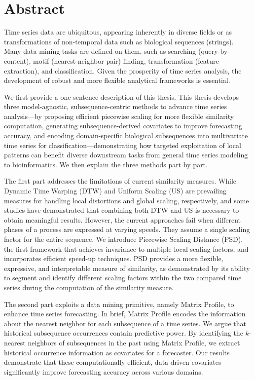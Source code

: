 \chapter*{Abstract}

Time series data are ubiquitous, appearing inherently in diverse fields or as transformations of non-temporal data such as biological sequences (strings).
%
Many data mining tasks are defined on them, such as searching (query-by-content), motif (nearest-neighbor pair) finding, transformation (feature extraction), and classification.
%
Given the prosperity of time series analysis, the development of robust and more flexible analytical frameworks is essential.

We first provide a one-sentence description of this thesis.
%
This thesis develops three model-agnostic, subsequence-centric methods to advance time series analysis—by 
proposing efficient piecewise scaling for more flexible similarity computation, 
generating subsequence-derived covariates to improve forecasting accuracy, 
and encoding domain-specific biological subsequences into multivariate time series for classification—demonstrating 
how targeted exploitation of local patterns can benefit diverse downstream tasks from general time series modeling to bioinformatics.
%
We then explain the three methods part by part.

The first part addresses the limitations of current similarity measures.
%
While Dynamic Time Warping (DTW) and Uniform Scaling (US) are prevailing measures for handling local distortions and global scaling, respectively, and some studies have demonstrated that combining both DTW and US is necessary to obtain meaningful results.
However, the current approaches fail when different phases of a process are expressed at varying speeds. They assume a single scaling factor for the entire sequence. 
%
We introduce Piecewise Scaling Distance (PSD), the first framework that achieves invariance to multiple local scaling factors, and incorporates efficient speed-up techniques. 
PSD provides a more flexible, expressive, and interpretable measure of similarity, as demonstrated by its ability to segment and identify different scaling factors within the two compared time series during the computation of the similarity measure.

The second part exploits a data mining primitive, namely Matrix Profile, to enhance time series forecasting. 
In brief, Matrix Profile encodes the information about the nearest neighbor for each subsequence of a time series.
We argue that historical subsequence occurrences contain predictive power. 
By identifying the $k$-nearest neighbors of subsequences in the past using Matrix Profile, we extract historical occurrence information as covariates for a forecaster. 
Our results demonstrate that these computationally efficient, data-driven covariates significantly improve forecasting accuracy across various domains.

